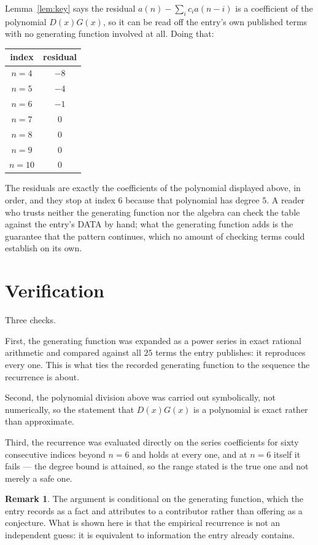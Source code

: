\documentclass[11pt,a4paper]{article}
\theoremstyle{plain}
\theoremstyle{definition}
\newtheorem{remark}[theorem]{Remark}
\begin{document}
Lemma~\ref{lem:key} says the residual $a(n)-\sum_ic_ia(n-i)$ is a coefficient of the
polynomial $D(x)G(x)$, so it can be read off the entry's own published terms with no
generating function involved at all. Doing that:
\begin{center}
\begin{tabular}{cc}
index & residual \\ \hline
$n=4$ & $-8$ \\
$n=5$ & $-4$ \\
$n=6$ & $-1$ \\
$n=7$ & $0$ \\
$n=8$ & $0$ \\
$n=9$ & $0$ \\
$n=10$ & $0$
\end{tabular}
\end{center}
The residuals are exactly the coefficients of the polynomial displayed above, in order, and
they stop at index $6$ because that polynomial has degree $5$. A reader who trusts
neither the generating function nor the algebra can check the table against the entry's DATA
by hand; what the generating function adds is the guarantee that the pattern continues, which
no amount of checking terms could establish on its own.

\section{Verification}

Three checks.

First, the generating function was expanded as a power series in exact rational arithmetic and
compared against all $25$ terms the entry publishes: it reproduces every one. This is
what ties the recorded generating function to the sequence the recurrence is about.

Second, the polynomial division above was carried out symbolically, not numerically, so the
statement that $D(x)G(x)$ is a polynomial is exact rather than approximate.

Third, the recurrence was evaluated directly on the series coefficients for sixty consecutive
indices beyond $n=6$ and holds at every one, and at $n=6$ itself it fails --- the
degree bound is attained, so the range stated is the true one and not merely a safe one.

\begin{remark}
The argument is conditional on the generating function, which the entry records as a fact and
attributes to a contributor rather than offering as a conjecture. What is shown here is that
the empirical recurrence is not an independent guess: it is equivalent to information the
entry already contains.
\end{remark}
\end{document}

